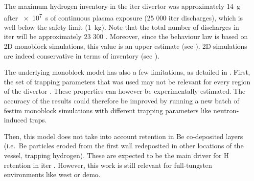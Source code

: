 The maximum hydrogen \gls{inventory} in the \gls{iter} \gls{divertor} was approximately \SI{14}{g} after \SI{e7}{s} of continuous plasma exposure (25 000 \gls{iter} discharges), which is well below the safety limit (\SI{1}{kg}).
Note that the total number of discharges in \gls{iter} will be approximately 23 300 \cite{pitts_physics_2019}.
Moreover, since the behaviour law is based on 2D \gls{monoblock} simulations, this value is an upper estimate (see ).
2D simulations are indeed conservative in terms of \gls{inventory} (see ).

The underlying \gls{monoblock} model has also a few limitations, as detailed in .
First, the set of trapping parameters that was used may not be relevant for every region of the \gls{divertor} .
These properties can however be experimentally estimated.
The accuracy of the results could therefore be improved by running a new batch of \gls{festim} \gls{monoblock} simulations with different trapping parameters like neutron-induced traps.

Then, this model does not take into account \gls{retention} in \gls{Be} co-deposited layers (i.e.\ \gls{Be} particles eroded from the \gls{first wall} redeposited in other locations of the vessel, trapping hydrogen).
These are expected to be the main driver for \gls{H} \gls{retention} in \gls{iter} .
However, this work is still relevant for full-tungsten environments like \gls{west} or \gls{demo}.
